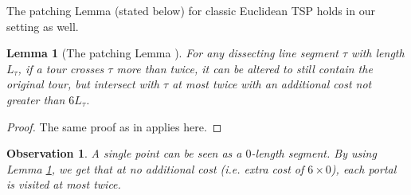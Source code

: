 \documentclass[pdflatex,sn-mathphys-num]{sn-jnl}
\theoremstyle{thmstyleone}
\newtheorem{lemma}{Lemma}
\newtheorem{observation}{Observation} %
\begin{document}
The patching Lemma (stated below) for classic Euclidean TSP holds in our setting as well.
\begin{lemma}[The patching Lemma \cite{Arora98}]\label{lemma:patching-lemma}
    For any dissecting line segment $\tau$ with length $L_\tau$, if a tour crosses $\tau$ more than twice, it can be altered to still contain the original tour, but intersect with $\tau$ at most twice with an additional cost not greater than $6L_\tau$. 
\end{lemma}
\begin{proof}
    The same proof as in \cite{Arora98} applies here.
\end{proof}


\begin{observation}\label{cor:portal-twice}
	A single point can be seen as a $ 0 $-length segment. By using Lemma \ref{lemma:patching-lemma}, we get that at no additional cost (i.e. extra cost of $ 6\times 0 $), each portal is visited at most twice.
\end{observation}
\end{document}
